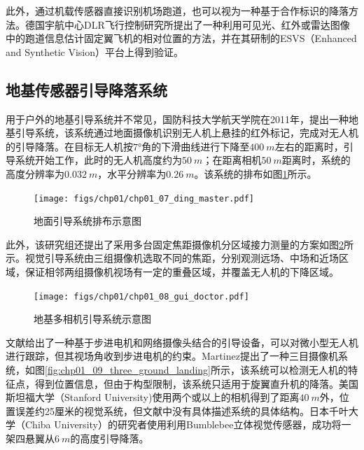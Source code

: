 此外，通过机载传感器直接识别机场跑道，也可以视为一种基于合作标识的降落方法。德国宇航中心DLR飞行控制研究所提出了一种利用可见光、红外或雷达图像中的跑道信息估计固定翼飞机的相对位置的方法，并在其研制的ESVS（Enhanced and Synthetic Vision）平台上得到验证\cite{doehler2003robust}。

\subsection{地基传感器引导降落系统} 

用于户外的地基引导系统并不常见，国防科技大学航天学院在2011年，提出一种地基引导系统\cite{Ding_master_2011}，该系统通过地面摄像机识别无人机上悬挂的红外标记，完成对无人机的引导降落。在目标无人机按$7 °$角的下滑曲线进行下降至$400\ m$左右的距离时，引导系统开始工作，此时的无人机高度约为$50\ m$；在距离相机$50\ m$距离时，系统的高度分辨率为$0.032\ m$，水平分辨率为$0.26\ m$。该系统的排布如图\ref{fig:chp01_07_ding_master}所示。

\begin{figure}[htb]   
	\centering
	\texttt{[image: figs/chp01/chp01\_07\_ding\_master.pdf]}
	\caption{地面引导系统排布示意图\cite{Ding_master_2011}}
	\label{fig:chp01_07_ding_master}
\end{figure}

此外，该研究组还提出了采用多台固定焦距摄像机分区域接力测量的方案如图\ref{fig:chp01_08_gui_doctor}所示\cite{gui_doctor_2013}。视觉引导系统由三组摄像机选取不同的焦距，分别观测远场、中场和近场区域，保证相邻两组摄像机视场有一定的重叠区域，并覆盖无人机的下降区域。

\begin{figure}[htb]   
	\centering
	\texttt{[image: figs/chp01/chp01\_08\_gui\_doctor.pdf]}
	\caption{地基多相机引导系统示意图\cite{gui_doctor_2013}}
	\label{fig:chp01_08_gui_doctor}
\end{figure}

文献\cite{Garcia-Pardo2002}给出了一种基于步进电机和网络摄像头结合的引导设备，可以对微小型无人机进行跟踪，但其视场角收到步进电机的约束。Martinez\cite{Martinez2010}提出了一种三目摄像机系统，如图\ref{fig:chp01_09_three_ground_landing}所示，该系统可以检测无人机的特征点，得到位置信息，但由于构型限制，该系统只适用于旋翼直升机的降落。美国斯坦福大学（Stanford University)\cite{Saripalli2003}使用两个或以上的相机得到了距离$40\ m$外，位置误差约25厘米的视觉系统，但文献中没有具体描述系统的具体结构。日本千叶大学（Chiba University）的研究者\cite{PEBRIANTI2010}使用利用Bumblebee立体视觉传感器，成功将一架四悬翼从$6\ m$的高度引导降落。

